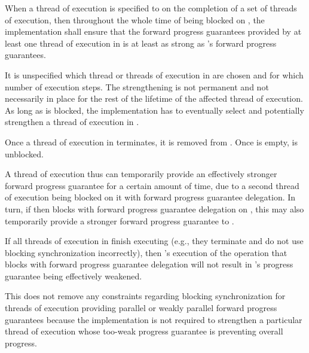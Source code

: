 \pnum
{}%
When a thread of execution  is specified to  on the completion of a set  of threads
of execution, then throughout the whole time of  being blocked on
, the implementation shall ensure that the forward progress guarantees
provided by at least one thread of execution in  is at least as strong
as 's forward progress guarantees.
\begin{note}
It is unspecified which thread or threads of execution in  are chosen
and for which number of execution steps. The strengthening is not permanent and
not necessarily in place for the rest of the lifetime of the affected thread of
execution. As long as  is blocked, the implementation has to eventually
select and potentially strengthen a thread of execution in .
\end{note}
Once a thread of execution in  terminates, it is removed from .
Once  is empty,  is unblocked.

\pnum
\begin{note}
A thread of execution  thus can temporarily provide an effectively
stronger forward progress guarantee for a certain amount of time, due to a
second thread of execution  being blocked on it with forward
progress guarantee delegation. In turn, if  then blocks with
forward progress guarantee delegation on , this may also temporarily
provide a stronger forward progress guarantee to .
\end{note}

\pnum
\begin{note}
If all threads of execution in  finish executing (e.g., they terminate
and do not use blocking synchronization incorrectly), then 's execution
of the operation that blocks with forward progress guarantee delegation will not
result in 's progress guarantee being effectively weakened.
\end{note}

\pnum
\begin{note}
This does not remove any constraints regarding blocking synchronization for
threads of execution providing parallel or weakly parallel forward progress
guarantees because the implementation is not required to strengthen a particular
thread of execution whose too-weak progress guarantee is preventing overall progress.
\end{note}

